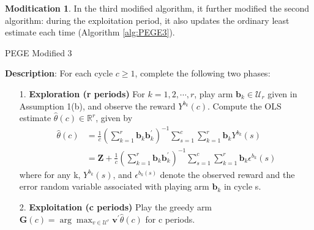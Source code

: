 \documentclass{article}
\theoremstyle{plain}
\theoremstyle{definition}
\newtheorem{modification}{Moditication}
\begin{document}
\begin{modification}
In the third modified algorithm, it further modified the second algorithm: during the exploitation period, it also updates the ordinary least estimate each time (Algorithm \ref{alg:PEGE3}).

\begin{algorithm}\label{alg:PEGE3}
\caption{PEGE Modified 3}
\textbf{Description}: For each cycle $c\geq 1$, complete the following two phases:
\begin{itemize}
\item [1. ] \textbf{Exploration (r periods)} For $k=1,2,\cdots,r$, play arm $\textbf{b}_{k}\in \mathcal{U}_{r}$ given in Assumption 1(b), and observe the reward $Y^{b_{k}}(c)$. Compute the OLS estimate $\hat{\theta}(c)\in \mathbb{R}^{r}$, given by
\begin{align}
\hat{\theta}(c)&=\frac{1}{c}(\sum_{k=1}^{r}\textbf{b}_{k}\textbf{b}_{k}^{'})^{-1}\sum_{s=1}^{c}\sum_{k=1}^{r}\textbf{b}_{k}Y^{b_{k}}(s) \nonumber \\
&=\textbf{Z}+\frac{1}{c}(\sum_{k=1}^{r}\textbf{b}_{k}\textbf{b}_{k}^{'})^{-1}\sum_{s=1}^{c}\sum_{k=1}^{r}\textbf{b}_{k}\epsilon^{b_{k}}(s) \nonumber 
\end{align}
where for any k, $Y^{b_{k}}(s)$, and $\epsilon^{b_{k}(s)}$ denote the observed reward and the error random variable associated with playing arm $\textbf{b}_{k}$ in cycle s.
\item [2. ] \textbf{Exploitation (c periods)} Play the greedy arm $\textbf{G}(c)=\arg \max_{v\in \mathcal{U}^{r}}\textbf{v}^{'}\hat{\theta}(c)$ for c periods.
\end{itemize}
\end{algorithm}

\end{modification}
\end{document}
